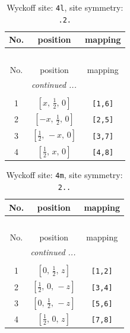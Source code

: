 \documentclass[fleqn,8pt]{jsarticle}
\begin{document}
\renewcommand{\arraystretch}{1.2}
\begin{longtable}{ccc}
\caption{Wyckoff site: {\tt 4l}, site symmetry: {\tt .2.}}
 \\
 \hline \hline
No. & position & mapping \\ \hline \endfirsthead

\multicolumn{2}{l}{\tablename\ \thetable{}} \\
 \hline \hline
No. & position & mapping \\ \hline \endhead

 \hline \hline
\multicolumn{2}{r}{\footnotesize\it continued ...} \\ \endfoot

 \hline \hline
\multicolumn{2}{r}{} \\ \endlastfoot

1 & $\left[ x,\, \frac{1}{2},\, 0 \right]$ & {\tt [1,6]} \\ \hline
2 & $\left[ - x,\, \frac{1}{2},\, 0 \right]$ & {\tt [2,5]} \\ \hline
3 & $\left[ \frac{1}{2},\, - x,\, 0 \right]$ & {\tt [3,7]} \\ \hline
4 & $\left[ \frac{1}{2},\, x,\, 0 \right]$ & {\tt [4,8]} \\
\end{longtable}
\renewcommand{\arraystretch}{1.2}
\begin{longtable}{ccc}
\caption{Wyckoff site: {\tt 4m}, site symmetry: {\tt 2..}}
 \\
 \hline \hline
No. & position & mapping \\ \hline \endfirsthead

\multicolumn{2}{l}{\tablename\ \thetable{}} \\
 \hline \hline
No. & position & mapping \\ \hline \endhead

 \hline \hline
\multicolumn{2}{r}{\footnotesize\it continued ...} \\ \endfoot

 \hline \hline
\multicolumn{2}{r}{} \\ \endlastfoot

1 & $\left[ 0,\, \frac{1}{2},\, z \right]$ & {\tt [1,2]} \\ \hline
2 & $\left[ \frac{1}{2},\, 0,\, - z \right]$ & {\tt [3,4]} \\ \hline
3 & $\left[ 0,\, \frac{1}{2},\, - z \right]$ & {\tt [5,6]} \\ \hline
4 & $\left[ \frac{1}{2},\, 0,\, z \right]$ & {\tt [7,8]} \\
\end{longtable}
\end{document}
